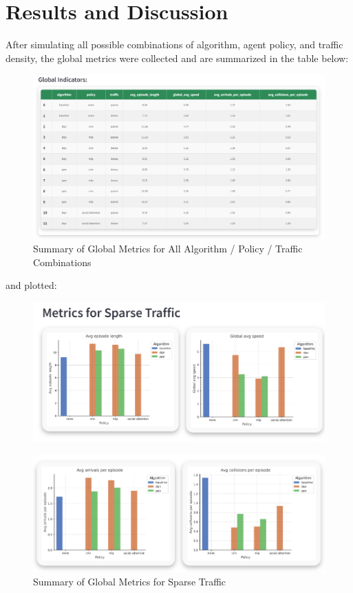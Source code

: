 \section{Results and Discussion}

After simulating all possible combinations of algorithm, agent policy, and traffic density, the global metrics were collected and are summarized in the table below:

\begin{figure}[H]
    \centering
    \includegraphics[width=\linewidth]{images/app_global_indicators.png} 
    \caption{Summary of Global Metrics for All Algorithm / Policy / Traffic Combinations}
\end{figure}

and plotted:

\begin{figure}[H]
    \centering
    \includegraphics[height=0.215\textheight]{images/app_global_plots_sparse1.png} 
\end{figure}

\begin{figure}[H]
    \centering
    \includegraphics[height=0.2\textheight]{images/app_global_plots_sparse2.png} 
    \caption{Summary of Global Metrics for Sparse Traffic}
\end{figure}


